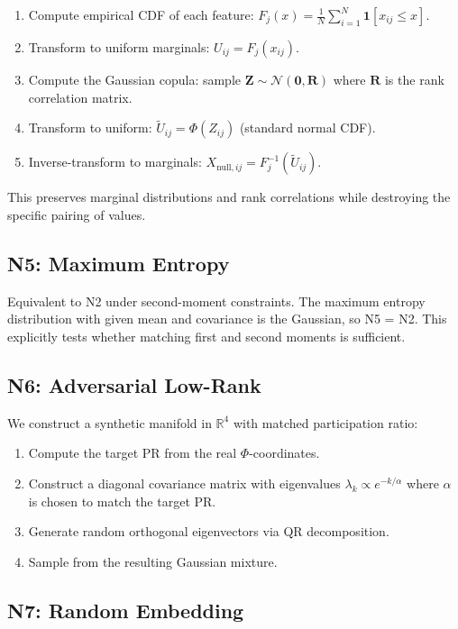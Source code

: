 \documentclass[10pt]{article}
\begin{document}
\begin{enumerate}
\item Compute empirical CDF of each feature: $F_j(x) = \frac{1}{N} \sum_{i=1}^N \mathbf{1}[x_{ij} \leq x]$.
\item Transform to uniform marginals: $U_{ij} = F_j(x_{ij})$.
\item Compute the Gaussian copula: sample $\mathbf{Z} \sim \mathcal{N}(\mathbf{0}, \mathbf{R})$ where $\mathbf{R}$ is the rank correlation matrix.
\item Transform to uniform: $\tilde{U}_{ij} = \Phi(Z_{ij})$ (standard normal CDF).
\item Inverse-transform to marginals: $X_{\text{null},ij} = F_j^{-1}(\tilde{U}_{ij})$.
\end{enumerate}

This preserves marginal distributions and rank correlations while destroying the specific pairing of values.

\subsection{N5: Maximum Entropy}

Equivalent to N2 under second-moment constraints. The maximum entropy distribution with given mean and covariance is the Gaussian, so N5 = N2. This explicitly tests whether matching first and second moments is sufficient.

\subsection{N6: Adversarial Low-Rank}

We construct a synthetic manifold in $\mathbb{R}^4$ with matched participation ratio:
\begin{enumerate}
\item Compute the target PR from the real $\Phi$-coordinates.
\item Construct a diagonal covariance matrix with eigenvalues $\lambda_k \propto e^{-k/\alpha}$ where $\alpha$ is chosen to match the target PR.
\item Generate random orthogonal eigenvectors via QR decomposition.
\item Sample from the resulting Gaussian mixture.
\end{enumerate}

\subsection{N7: Random Embedding}
\end{document}
